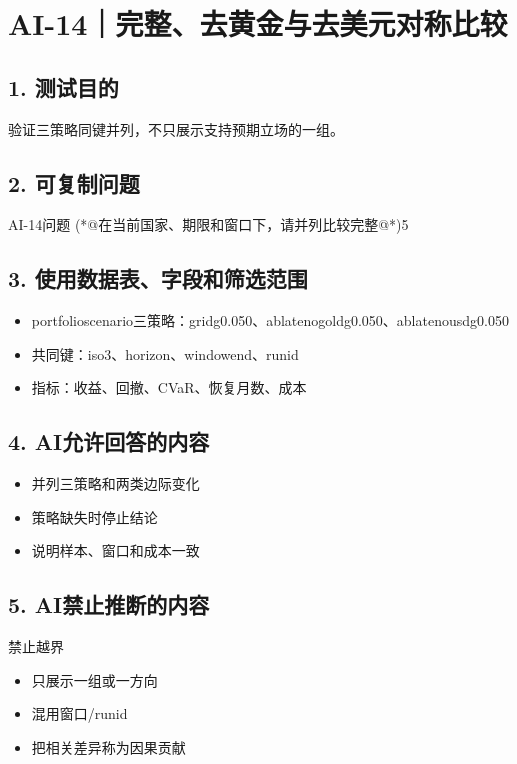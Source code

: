 \documentclass[UTF8,openany,zihao=-4]{ctexbook}
\renewcommand{\_}{\textunderscore\allowbreak}
\begin{document}
\clearpage
\section{AI-14｜完整、去黄金与去美元对称比较}
\subsection*{1. 测试目的}
验证三策略同键并列，不只展示支持预期立场的一组。


\subsection*{2. 可复制问题}
\begin{PromptBox}{AI-14问题}
(*@{\promptcjk 在当前国家、期限和窗口下，请并列比较完整}@*)5%
\end{PromptBox}

\subsection*{3. 使用数据表、字段和筛选范围}
\begin{itemize}
\item portfolio\_scenario三策略：grid\_g0.050、ablate\_no\_gold\_g0.050、ablate\_no\_usd\_g0.050
\item 共同键：iso3、horizon、window\_end、run\_id
\item 指标：收益、回撤、CVaR、恢复月数、成本
\end{itemize}

\subsection*{4. AI允许回答的内容}
\begin{itemize}
\item 并列三策略和两类边际变化
\item 策略缺失时停止结论
\item 说明样本、窗口和成本一致
\end{itemize}

\subsection*{5. AI禁止推断的内容}
\begin{dangerbox}{禁止越界}
\begin{itemize}
\item 只展示一组或一方向
\item 混用窗口/run\_id
\item 把相关差异称为因果贡献
\end{itemize}
\end{dangerbox}
\end{document}
